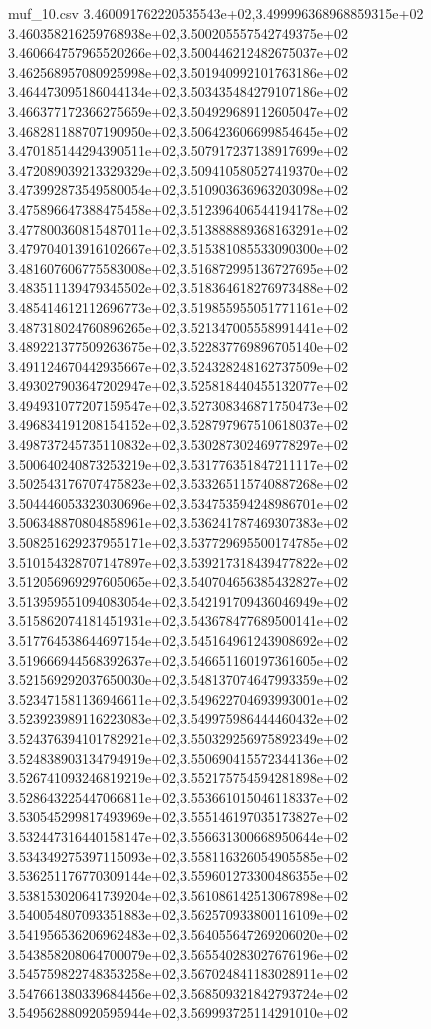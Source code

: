 \begin{filecontents*}{muf_10.csv}
3.460091762220535543e+02,3.499996368968859315e+02
3.460358216259768938e+02,3.500205557542749375e+02
3.460664757965520266e+02,3.500446212482675037e+02
3.462568957080925998e+02,3.501940992101763186e+02
3.464473095186044134e+02,3.503435484279107186e+02
3.466377172366275659e+02,3.504929689112605047e+02
3.468281188707190950e+02,3.506423606699854645e+02
3.470185144294390511e+02,3.507917237138917699e+02
3.472089039213329329e+02,3.509410580527419370e+02
3.473992873549580054e+02,3.510903636963203098e+02
3.475896647388475458e+02,3.512396406544194178e+02
3.477800360815487011e+02,3.513888889368163291e+02
3.479704013916102667e+02,3.515381085533090300e+02
3.481607606775583008e+02,3.516872995136727695e+02
3.483511139479345502e+02,3.518364618276973488e+02
3.485414612112696773e+02,3.519855955051771161e+02
3.487318024760896265e+02,3.521347005558991441e+02
3.489221377509263675e+02,3.522837769896705140e+02
3.491124670442935667e+02,3.524328248162737509e+02
3.493027903647202947e+02,3.525818440455132077e+02
3.494931077207159547e+02,3.527308346871750473e+02
3.496834191208154152e+02,3.528797967510618037e+02
3.498737245735110832e+02,3.530287302469778297e+02
3.500640240873253219e+02,3.531776351847211117e+02
3.502543176707475823e+02,3.533265115740887268e+02
3.504446053323030696e+02,3.534753594248986701e+02
3.506348870804858961e+02,3.536241787469307383e+02
3.508251629237955171e+02,3.537729695500174785e+02
3.510154328707147897e+02,3.539217318439477822e+02
3.512056969297605065e+02,3.540704656385432827e+02
3.513959551094083054e+02,3.542191709436046949e+02
3.515862074181451931e+02,3.543678477689500141e+02
3.517764538644697154e+02,3.545164961243908692e+02
3.519666944568392637e+02,3.546651160197361605e+02
3.521569292037650030e+02,3.548137074647993359e+02
3.523471581136946611e+02,3.549622704693993001e+02
3.523923989116223083e+02,3.549975986444460432e+02
3.524376394101782921e+02,3.550329256975892349e+02
3.524838903134794919e+02,3.550690415572344136e+02
3.526741093246819219e+02,3.552175754594281898e+02
3.528643225447066811e+02,3.553661015046118337e+02
3.530545299817493969e+02,3.555146197035173827e+02
3.532447316440158147e+02,3.556631300668950644e+02
3.534349275397115093e+02,3.558116326054905585e+02
3.536251176770309144e+02,3.559601273300486355e+02
3.538153020641739204e+02,3.561086142513067898e+02
3.540054807093351883e+02,3.562570933800116109e+02
3.541956536206962483e+02,3.564055647269206020e+02
3.543858208064700079e+02,3.565540283027676196e+02
3.545759822748353258e+02,3.567024841183028911e+02
3.547661380339684456e+02,3.568509321842793724e+02
3.549562880920595944e+02,3.569993725114291010e+02

\end{filecontents*}
